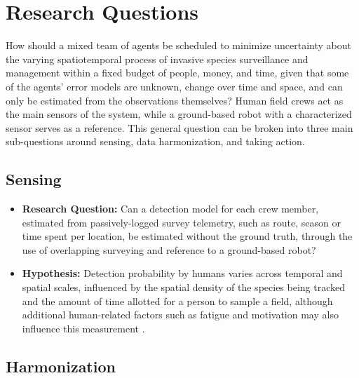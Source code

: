 \documentclass{article}
\begin{document}
\section{Research Questions}
How should a mixed team of agents be scheduled to minimize uncertainty about the varying spatiotemporal process of invasive species surveillance and management within a fixed budget of people, money, and time, given that some of the agents’ error models are unknown, change over time and space, and can only be estimated from the observations themselves? Human field crews act as the main sensors of the system, while a ground-based robot with a characterized sensor serves as a reference. This general question can be broken into three main sub-questions around sensing, data harmonization, and taking action.

\subsection{Sensing}

    \begin{itemize}
        \item \textbf{Research Question:} Can a detection model for each crew member, estimated from passively-logged survey telemetry, such as route, season or time spent per location, be estimated without the ground truth, through the use of overlapping surveying and reference to a ground-based robot?

        \item \textbf{Hypothesis:} Detection probability by humans varies across temporal and spatial scales, influenced by the spatial density of the species being tracked and the amount of time allotted for a person to sample a field, although additional human-related factors such as fatigue and motivation may also influence this measurement \cite{plants-stand-still-but-hide}.
    \end{itemize}


\subsection{Harmonization}
\end{document}
